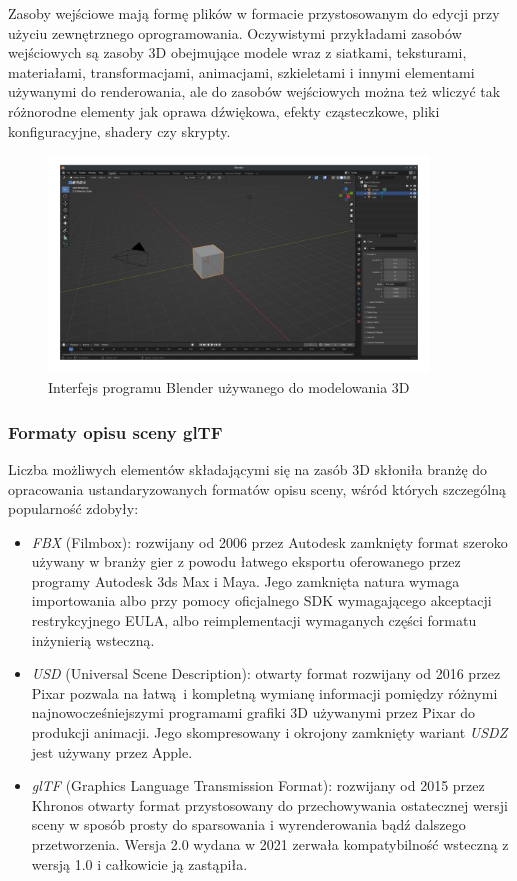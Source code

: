 Zasoby wejściowe mają formę plików w formacie przystosowanym do edycji przy użyciu zewnętrznego oprogramowania.
Oczywistymi przykładami zasobów wejściowych są zasoby 3D obejmujące modele wraz z siatkami, teksturami, materiałami, transformacjami, animacjami, szkieletami i innymi elementami używanymi do renderowania, ale do zasobów wejściowych można też wliczyć tak różnorodne elementy jak oprawa dźwiękowa, efekty cząsteczkowe, pliki konfiguracyjne, shadery czy skrypty.
\begin{figure}[htbp]
	\centering
	\includegraphics[width=0.9\textwidth]{images/blender.png}
	\caption{Interfejs programu Blender \cite{BLENDER} używanego do modelowania 3D}
	\label{blendermodel}
\end{figure}


\subsubsection{Formaty opisu sceny glTF}

Liczba możliwych elementów składającymi się na zasób 3D skłoniła branżę do opracowania ustandaryzowanych formatów opisu sceny, wśród których szczególną popularność zdobyły:
\begin{itemize}
	\item \textit{FBX} (Filmbox): rozwijany od 2006 przez Autodesk zamknięty format szeroko używany w branży gier z powodu łatwego eksportu oferowanego przez programy Autodesk 3ds Max i Maya.
	Jego zamknięta natura wymaga importowania albo przy pomocy oficjalnego SDK wymagającego akceptacji restrykcyjnego EULA, albo reimplementacji wymaganych części formatu inżynierią wsteczną.
	\item \textit{USD} (Universal Scene Description): otwarty format rozwijany od 2016 przez Pixar pozwala na łatwą i kompletną wymianę informacji pomiędzy różnymi najnowocześniejszymi programami grafiki 3D używanymi przez Pixar do produkcji animacji.
	Jego skompresowany i okrojony zamknięty wariant \textit{USDZ} jest używany przez Apple.
	\item \textit{glTF} (Graphics Language Transmission Format): rozwijany od 2015 przez Khronos otwarty format przystosowany do przechowywania ostatecznej wersji sceny w sposób prosty do sparsowania i wyrenderowania bądź dalszego przetworzenia.
	Wersja 2.0 wydana w 2021 zerwała kompatybilność wsteczną z wersją 1.0 i całkowicie ją zastąpiła.
\end{itemize}

